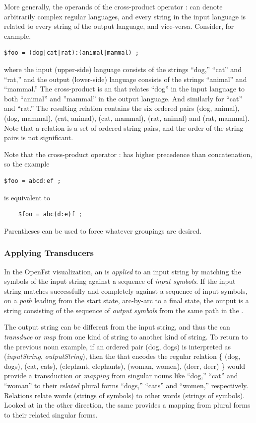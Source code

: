 More generally, the operands of the cross-product operator : can denote arbitrarily complex regular languages, 
and every string in the input language is related to every string of the
output language, and vice-versa.  Consider, for example,

\begin{Verbatim}
$foo = (dog|cat|rat):(animal|mammal) ;
\end{Verbatim}

\noindent
where the input (upper-side) language consists of the strings ``dog,'' ``cat'' and ``rat,'' and the output (lower-side)
language consists of the strings ``animal'' and ``mammal.''  The cross-product is an \fst{} that
relates ``dog'' in the input language to both ``animal'' and ''mammal'' in the output
language.  And similarly for ``cat'' and ``rat.''  The resulting relation
contains the six ordered pairs (dog, animal), (dog, mammal), (cat, animal), (cat,
mammal), (rat, animal) and (rat, mammal).  Note that a relation is a set of ordered string
pairs, and the order of the string pairs is not significant.

Note that the cross-product operator : has higher precedence than concatenation, so  the example

\begin{Verbatim}
$foo = abcd:ef ;
\end{Verbatim}

\noindent
is equivalent to

\begin{Verbatim}
	$foo = abc(d:e)f ;
\end{Verbatim}

\noindent
Parentheses can be used to force whatever groupings are desired.


\subsubsection{Applying Transducers}

In the OpenFst visualization, an \fst{} is \emph{applied} to an input string by
matching the symbols of the input string against a sequence of \emph{input symbols}.  If the input string matches successfully
and completely against a sequence of input symbols, on a \emph{path} leading from the start state,
arc-by-arc to a final state, 
the output is a string consisting of the sequence of \emph{output symbols} from the same path 
in the \fst{}.  

The output string can be different from the input string, and thus
the \fst{} can \emph{transduce} or \emph{map} from one kind of string to another kind of string.  To return to the
previous noun example, if an ordered pair (dog, dogs) is interpreted as (\emph{inputString},
\emph{outputString}),
then the \fst{} that encodes the regular relation \{ (dog, dogs), (cat, cats), (elephant,
elephants), (woman, women), (deer, deer) \} would provide a transduction or \emph{mapping}
from singular nouns like ``dog,'' ``cat'' and ``woman'' to their \emph{related} plural forms ``dogs,''
``cats'' and ``women,'' respectively.  Relations relate words (strings of symbols) to other
words (strings of symbols). 
Looked at in the other direction,
the same \fst{} provides a mapping from plural forms to their
related singular forms.

